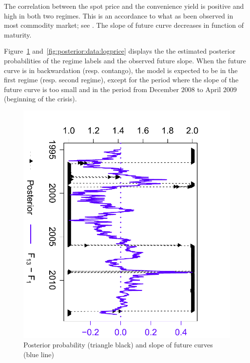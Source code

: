 The correlation between the spot price and the convenience yield is positive and high in both two regimes. This is an accordance to what as been observed in most commodity market; see \cite{gibson:schwartz:1990}.  The slope of future curve decreases in function of maturity. 

Figure~\ref{fig:posterior:data} and~\ref{fig:posterior:data:logprice} displays the the estimated posterior probabilities of the regime labels and the observed future slope. When the future curve is in backwardation (resp. contango), the model is expected to be in the first regime (resp. second regime), except for the period where the slope of the future curve is too small and in the period from December $2008$ to April $2009$ (beginning of the crisis).






\begin{figure}
	\centering
	\includegraphics[scale=.75,angle=90]{Posterior_Data}
	\caption{Posterior probability (triangle black) and slope of future curves (blue line)}
	\label{fig:posterior:data}
\end{figure}

